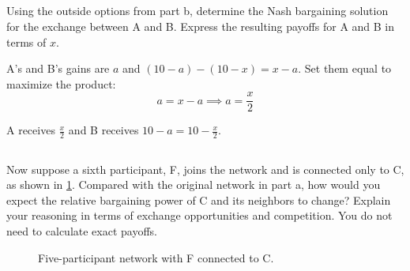 \documentclass[newpages]{assignment}
\begin{document}
\subsection{}
\begin{problem}
    Using the outside options from part b, determine the Nash bargaining solution for the exchange between A and B. Express the resulting payoffs for A and B in terms of \(x\).
\end{problem}

\begin{solution}
    A's and B's gains are $a$ and $(10-a)-(10-x)=x-a$. Set them equal to maximize the product:
    \begin{equation}
        a=x-a
        \implies a=\frac{x}{2}
    \end{equation}

    A receives $\boxed{\frac{x}{2}}$ and B receives $10-a=\boxed{10-\frac{x}{2}}$.
\end{solution}

\subsection{}
\begin{problem}
    Now suppose a sixth participant, F, joins the network and is connected only to C, as shown in \cref{fig:hw7-path-with-f}. Compared with the original network in part a, how would you expect the relative bargaining power of C and its neighbors to change? Explain your reasoning in terms of exchange opportunities and competition. You do not need to calculate exact payoffs.

    \begin{figure}[H]
        \centering
        \caption{Five-participant network with F connected to C.}
        \label{fig:hw7-path-with-f}
    \end{figure}
\end{problem}
\end{document}
